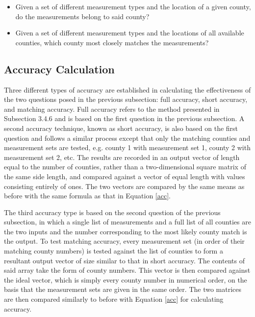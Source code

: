 \documentclass[12pt]{uthesis-v12}  %
\begin{document}
\begin{itemize}
  \item Given a set of different measurement types and the location of a given county, do the measurements belong to said county?
  \item Given a set of different measurement types and the locations of all available counties, which county most closely matches the measurements?
\end{itemize}

\subsection{Accuracy Calculation}

Three different types of accuracy are established in calculating the effectiveness of the two questions posed in the previous subsection: full accuracy, short accuracy, and matching accuracy. Full accuracy refers to the method presented in Subsection 3.4.6 and is based on the first question in the previous subsection. A second accuracy technique, known as short accuracy, is also based on the first question and follows a similar process except that only the matching counties and measurement sets are tested, e.g. county 1 with measurement set 1, county 2 with measurement set 2, etc. The results are recorded in an output vector of length equal to the number of counties, rather than a two-dimensional square matrix of the same side length, and compared against a vector of equal length with values consisting entirely of ones. The two vectors are compared by the same means as before with the same formula as that in Equation \ref{acc}. 

The third accuracy type is based on the second question of the previous subsection, in which a single list of measurements and a full list of all counties are the two inputs and the number corresponding to the most likely county match is the output. To test matching accuracy, every measurement set (in order of their matching county numbers) is tested against the list of counties to form a resultant output vector of size similar to that in short accuracy. The contents of said array take the form of county numbers. This vector is then compared against the ideal vector, which is simply every county number in numerical order, on the basis that the measurement sets are given in the same order. The two matrices are then compared similarly to before with Equation \ref{acc} for calculating accuracy.
\end{document}
